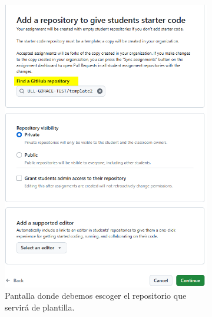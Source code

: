 \begin{figure}
\begin{subfigure}{0.24\textwidth}
        \label{fig:ghc-new-assig-1}
    \end{subfigure}
    \hspace*{\fill}   %
    \begin{subfigure}{0.24\textwidth}
        \includegraphics[width=1\linewidth]{images/ghc-new-assig-2.png}
        \caption{Pantalla donde debemos escoger el repositorio que servirá de plantilla.}
        \label{fig:ghc-new-assig-2}
    \end{subfigure}
    \hspace*{\fill}   %
    \begin{subfigure}{0.24\textwidth}

\end{subfigure}
\end{figure}
